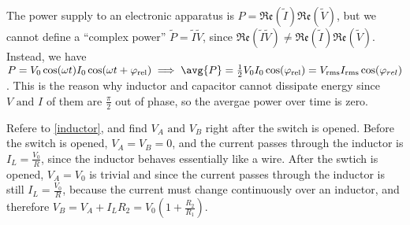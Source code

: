 \documentclass[english,a4paper,12pt]{report}
\begin{document}
The power supply to an electronic apparatus is \(P = \mathfrak{Re} (\tilde{I} )\mathfrak{Re} (\tilde{V} )  \), but we cannot define a ``complex power'' \(\tilde{P} = \tilde{I} \tilde{V}   \), since \(\mathfrak{Re} (\tilde{I} \tilde{V}  ) \neq \mathfrak{Re} (\tilde{I} ) \mathfrak{Re} (\tilde{V} )  \). Instead, we have \(P = V_0 \cos (\omega t) I_0 \cos (\omega t+ \varphi _{\text{rel} } ) \implies \avg{P} = \frac{1}{2}V_0 I_0 \cos (\varphi _{\text{rel} }) = V_{\text{rms} }I_{\text{rms} }\cos (\varphi _{rel})   \). This is the reason why inductor and capacitor cannot dissipate energy since \(V \text { and } I\) of them are \(\frac{\pi }{2} \) out of phase, so the avergae power over time is zero.  

{Refere to \cref{inductor}, and find \(V_{A} \text { and } V_{B}  \) right after the switch is opened.}
{Before the switch is opened, \(V_{A} = V_{B} = 0\), and the current passes through the inductor is \(I_{L} = \frac{V_0 }{R}  \), since the inductor behaves essentially like a wire. After the swtich is opened, \(V_{A} = V_{0}  \) is trivial and since the current passes through the inductor is still \(I_{L} = \frac{V_0 }{R}  \), because the current must change continuously over an inductor, and therefore \(V_{B} = V_{A} + I_{L}R_2 = V_{0} \left( 1+ \frac{R_2 }{R_1 }  \right)   \).   } 

\end{document}
